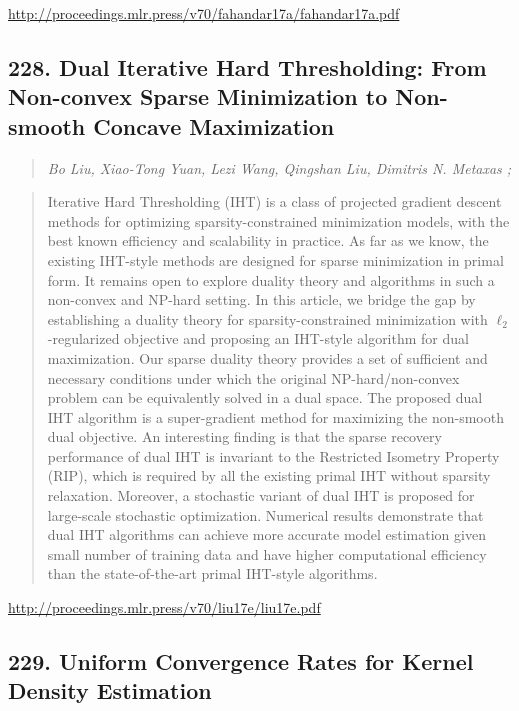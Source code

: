 \documentclass{article}
\begin{document}
\href{http://proceedings.mlr.press/v70/fahandar17a/fahandar17a.pdf}{http://proceedings.mlr.press/v70/fahandar17a/fahandar17a.pdf}

\subsection{228. Dual Iterative Hard Thresholding: From Non-convex Sparse Minimization to Non-smooth Concave Maximization}

\begin{quote}
\footnotesize{\textit{Bo Liu, Xiao-Tong Yuan, Lezi Wang, Qingshan Liu, Dimitris N. Metaxas ;}}
\end{quote}

\begin{quote}
    Iterative Hard Thresholding (IHT) is a class of projected gradient descent methods for optimizing sparsity-constrained minimization models, with the best known efficiency and scalability in practice. As far as we know, the existing IHT-style methods are designed for sparse minimization in primal form. It remains open to explore duality theory and algorithms in such a non-convex and NP-hard setting. In this article, we bridge the gap by establishing a duality theory for sparsity-constrained minimization with $\ell_2$-regularized objective and proposing an IHT-style algorithm for dual maximization. Our sparse duality theory provides a set of sufficient and necessary conditions under which the original NP-hard/non-convex problem can be equivalently solved in a dual space. The proposed dual IHT algorithm is a super-gradient method for maximizing the non-smooth dual objective. An interesting finding is that the sparse recovery performance of dual IHT is invariant to the Restricted Isometry Property (RIP), which is required by all the existing primal IHT without sparsity relaxation. Moreover, a stochastic variant of dual IHT is proposed for large-scale stochastic optimization. Numerical results demonstrate that dual IHT algorithms can achieve more accurate model estimation given small number of training data and have higher computational efficiency than the state-of-the-art primal IHT-style algorithms.  \end{quote}

\href{http://proceedings.mlr.press/v70/liu17e/liu17e.pdf}{http://proceedings.mlr.press/v70/liu17e/liu17e.pdf}

\subsection{229. Uniform Convergence Rates for Kernel Density Estimation}
\end{document}
